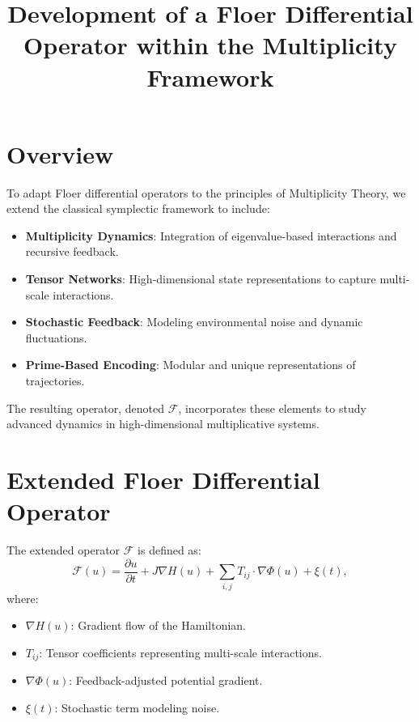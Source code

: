 \documentclass{article}
\begin{document}
\title{Development of a Floer Differential Operator within the Multiplicity Framework}
\author{}
\date{}
\maketitle

\section*{Overview}

To adapt Floer differential operators to the principles of Multiplicity Theory, we extend the classical symplectic framework to include:

\begin{itemize}
    \item \textbf{Multiplicity Dynamics}: Integration of eigenvalue-based interactions and recursive feedback.
    \item \textbf{Tensor Networks}: High-dimensional state representations to capture multi-scale interactions.
    \item \textbf{Stochastic Feedback}: Modeling environmental noise and dynamic fluctuations.
    \item \textbf{Prime-Based Encoding}: Modular and unique representations of trajectories.
\end{itemize}

The resulting operator, denoted $\mathcal{F}$, incorporates these elements to study advanced dynamics in high-dimensional multiplicative systems.

\section*{Extended Floer Differential Operator}

The extended operator $\mathcal{F}$ is defined as:
\begin{equation}
    \mathcal{F}(u) = \frac{\partial u}{\partial t} + J \nabla H(u) + \sum_{i,j} T_{ij} \cdot \nabla \Phi(u) + \xi(t),
\end{equation}
where:
\begin{itemize}
    \item $\nabla H(u)$: Gradient flow of the Hamiltonian.
    \item $T_{ij}$: Tensor coefficients representing multi-scale interactions.
    \item $\nabla \Phi(u)$: Feedback-adjusted potential gradient.
    \item $\xi(t)$: Stochastic term modeling noise.
\end{itemize}
\end{document}
